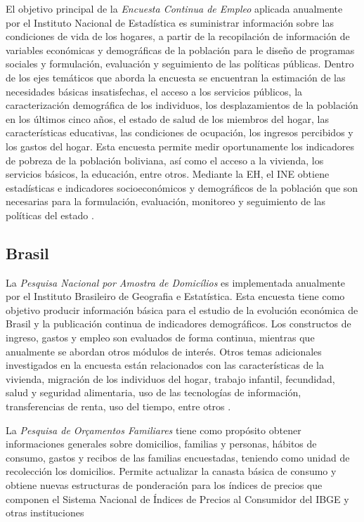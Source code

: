 \documentclass[
  12pt,
  spanish,
]{book}
\begin{document}
El objetivo principal de la \emph{Encuesta Continua de Empleo} aplicada anualmente por el Instituto Nacional de Estadística es suministrar información sobre las condiciones de vida de los hogares, a partir de la recopilación de información de variables económicas y demográficas de la población para le diseño de programas sociales y formulación, evaluación y seguimiento de las políticas públicas. Dentro de los ejes temáticos que aborda la encuesta se encuentran la estimación de las necesidades básicas insatisfechas, el acceso a los servicios públicos, la caracterización demográfica de los individuos, los desplazamientos de la población en los últimos cinco años, el estado de salud de los miembros del hogar, las características educativas, las condiciones de ocupación, los ingresos percibidos y los gastos del hogar. Esta encuesta permite medir oportunamente los indicadores de pobreza de la población boliviana, así como el acceso a la vivienda, los servicios básicos, la educación, entre otros. Mediante la EH, el INE obtiene estadísticas e indicadores socioeconómicos y demográficos de la población que son necesarias para la formulación, evaluación, monitoreo y seguimiento de las políticas del estado \citep{INE-BO}.

\hypertarget{brasil}{%
\subsection{Brasil}\label{brasil}}

La \emph{Pesquisa Nacional por Amostra de Domicílios} es implementada anualmente por el Instituto Brasileiro de Geografia e Estatística. Esta encuesta tiene como objetivo producir información básica para el estudio de la evolución económica de Brasil y la publicación continua de indicadores demográficos. Los constructos de ingreso, gastos y empleo son evaluados de forma continua, mientras que anualmente se abordan otros módulos de interés. Otros temas adicionales investigados en la encuesta están relacionados con las características de la vivienda, migración de los individuos del hogar, trabajo infantil, fecundidad, salud y seguridad alimentaria, uso de las tecnologías de información, transferencias de renta, uso del tiempo, entre otros \citep{IBGEBR_2017}.

La \emph{Pesquisa de Orçamentos Familiares} tiene como propósito obtener informaciones generales sobre domicilios, familias y personas, hábitos de consumo, gastos y recibos de las familias encuestadas, teniendo como unidad de recolección los domicilios. Permite actualizar la canasta básica de consumo y obtiene nuevas estructuras de ponderación para los índices de precios que componen el Sistema Nacional de Índices de Precios al Consumidor del IBGE y otras instituciones \citep{IBGE-BR2018}
\end{document}

